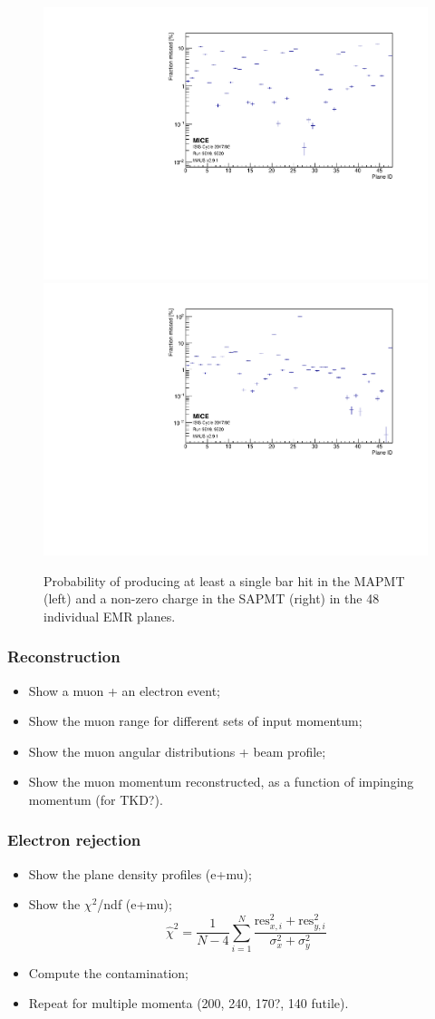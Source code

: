 \begin{figure}
	\begin{center}
		\includegraphics[width=0.49\columnwidth]{missed_mapmt.pdf}
		\hfill
		\includegraphics[width=0.49\columnwidth]{missed_sapmt.pdf}
		\caption{Probability of producing at least a single bar hit in the MAPMT (left) and a non-zero charge in the SAPMT (right) in the 48 individual EMR planes.}
		\label{fig:emr_plane_eff}
	\end{center}
\end{figure}

\subsubsection{Reconstruction}
\begin{itemize}
	\item Show a muon + an electron event;
	\item Show the muon range for different sets of input momentum;
	\item Show the muon angular distributions + beam profile;
	\item Show the muon momentum reconstructed, as a function of impinging momentum (for TKD?).
\end{itemize}

\subsubsection{Electron rejection}

\begin{itemize}
	\item Show the plane density profiles (e+mu);
	\item Show the $\chi^2$/ndf (e+mu);
	\begin{equation}
	\hat{\chi}^2=\frac{1}{N-4}\sum_{i=1}^{N}\frac{\text{res}_{x,i}^2+\text{res}_{y,i}^2}{\sigma_x^2+\sigma_y^2}
	\end{equation}
	\item Compute the contamination;
	\item Repeat for multiple momenta (200, 240, 170?, 140 futile).
\end{itemize}

